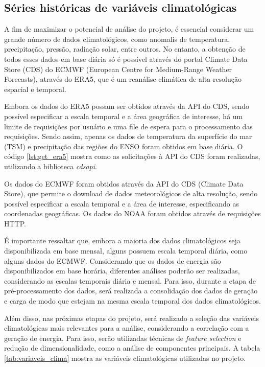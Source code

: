 \subsection{Séries históricas de variáveis climatológicas}
A fim de maximizar o potencial de análise do projeto, é essencial considerar um grande número de dados climatológicos, 
como anomalis de temperatura, precipitação, pressão, radiação solar, entre outros. No entanto, a obtenção de todos esses
dados em base diária só é possível através do portal Climate Data Store (CDS) do ECMWF (European Centre for Medium-Range
 Weather Forecasts), através do ERA5, que é um reanálise climática de alta resolução espacial e temporal. \cite{C3S2024}

Embora os dados do ERA5 possam ser obtidos através da API do CDS, sendo possível especificar a escala temporal e a área
geográfica de interesse, há um limite de requisições por usuário e uma file de espera para o processamento das 
requisições. Sendo assim, apenas os dados de temperatura da superfície do mar (TSM) e precipitação das regiões do ENSO 
foram obtidos em base diária. O código \ref{lst:get_era5} mostra como as solicitações à API do CDS foram realizadas,
utilizando a biblioteca \textit{cdsapi}.

Os dados do ECMWF foram obtidos através da API do CDS (Climate Data Store), que permite o download de dados 
meteorológicos de alta resolução, sendo possível especificar a escala temporal e a área de interesse, especificando as 
coordenadas geográficas. Os dados do NOAA foram obtidos através de requisições HTTP.

É importante ressaltar que, embora a maioria dos dados climatológicos seja disponibilizada em base mensal, alguns
possuem escala temporal diária, como alguns dados do ECMWF. Considerando que os dados de energia são disponibilizados em
base horária, diferentes análises poderão ser realizadas, considerando as escalas temporais diária e mensal. Para isso,
durante a etapa de pré-processamento dos dados, será realizada a consolidação dos dados de geração e carga de modo que
estejam na mesma escala temporal dos dados climatológicos.

\begin{figure}[!ht]
	{}
	{}
\end{figure}

Além disso, nas próximas etapas do projeto, será realizado a seleção das variáveis climatológicas mais relevantes para
a análise, considerando a correlação com a geração de energia. Para isso, serão utilizadas técnicas de \textit{feature
selection} e redução de dimensionalidade, como a análise de componentes principais. A tabela \ref{tab:variaveis_clima}
mostra as variáveis climatológicas utilizadas no projeto.

